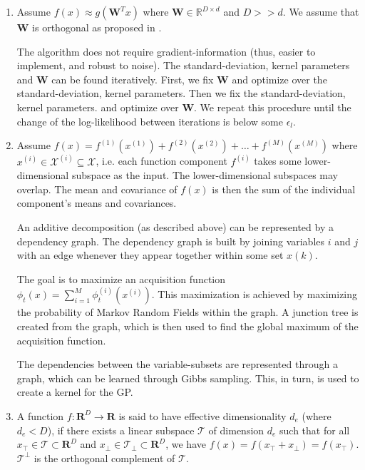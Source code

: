 \begin{enumerate}
\item \cite{Tripathy}
Assume $f(x) \approx g( \mathbf{W}^T x)$ where $ \mathbf{W} \in \mathbb{R}^{D \times d} $ and $D >> d$.
We assume that $ \mathbf{W} $ is orthogonal as proposed in \cite{Tripathy}.

The algorithm does not require gradient-information (thus, easier to implement, and robust to noise).
The standard-deviation, kernel parameters and  $ \mathbf{W} $ can be found iteratively.
First, we fix $ \mathbf{W} $ and optimize over the standard-deviation, kernel parameters.
Then we fix the standard-deviation, kernel parameters. and optimize over $ \mathbf{W} $.
We repeat this procedure until the change of the log-likelihood between iterations is below some $ \epsilon_l $.

\item \cite{Rolland}
Assume $f(x) = f^{(1)}( x^{(1)} )  + f^{(2)}( x^{(2)} ) + \ldots + f^{(M)}( x^{(M)} )$ where $ x^{(i)} \in \mathcal{X}^{(i)} \subseteq \mathcal{X}$, i.e. each function component  $f^{(i)}$ takes some lower-dimensional subspace as the input.
The lower-dimensional subspaces may overlap.
The mean and covariance of $f(x)$ is then the sum of the individual component's means and covariances.

An additive decomposition (as described above) can be represented by a dependency graph. The dependency graph is built by joining variables $i$ and $j$ with an edge whenever they appear together within some set $x(k)$. 

The goal is to maximize an acquisition function $ \phi_t(x) = \sum_{i=1}^M \phi_t^{(i)} ( x^{(i)} )$. 
This maximization is achieved by maximizing the probability of Markov Random Fields within the graph.
A junction tree is created from the graph, which is then used to find the global maximum of the acquisition function.

The dependencies between the variable-subsets are represented through a graph, which can be learned through Gibbs sampling.
This, in turn, is used to create a kernel for the GP.

\item \cite{Wang}
A function $f : \mathbf{R}^D \rightarrow \mathbf{R}$ is said to have effective dimensionality $d_e$ (where $d_e < D$), if there exists a linear subspace $\mathcal{T}$ of dimension $d_e$ such that for all $ x_\top \in \mathcal{T} \subset \mathbf{R}^D $ and $x_\perp \in \mathcal{T_\perp} \subset \mathbf{R}^D $, we have $ f(x) = f(x_\top +x_\perp ) = f(x_\top)$.
$\mathcal{T^\perp}$ is the orthogonal complement of $\mathcal{T}$.


\end{enumerate}
